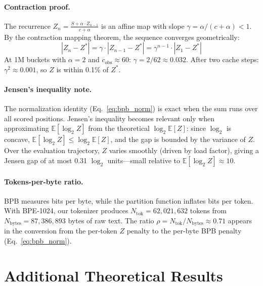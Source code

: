 \documentclass[11pt]{article}
\newcommand{\E}{\mathbb{E}}
\begin{document}
\paragraph{Contraction proof.} The recurrence $Z_n = \frac{S + \alpha \cdot Z_{n-1}}{c + \alpha}$ is an affine map with slope $\gamma = \alpha/(c + \alpha) < 1$. By the contraction mapping theorem, the sequence converges geometrically:
\[
|Z_n - Z^*| = \gamma \cdot |Z_{n-1} - Z^*| = \gamma^{n-1} \cdot |Z_1 - Z^*|
\]
At 1M buckets with $\alpha = 2$ and $c_{\text{obs}} \approx 60$: $\gamma = 2/62 \approx 0.032$. After two cache steps: $\gamma^2 \approx 0.001$, so $Z$ is within 0.1\% of $Z^*$.

\paragraph{Jensen's inequality note.} The normalization identity (Eq.~\ref{eq:bpb_norm}) is exact when the sum runs over all scored positions. Jensen's inequality becomes relevant only when approximating $\E[\log_2 Z]$ from the theoretical $\log_2 \E[Z]$: since $\log_2$ is concave, $\E[\log_2 Z] \leq \log_2 \E[Z]$, and the gap is bounded by the variance of $Z$. Over the evaluation trajectory, $Z$ varies smoothly (driven by load factor), giving a Jensen gap of at most 0.31 $\log_2$ units---small relative to $\E[\log_2 Z] \approx 10$.

\paragraph{Tokens-per-byte ratio.} BPB measures bits per byte, while the partition function inflates bits per token. With BPE-1024, our tokenizer produces $N_{\text{tok}} = 62{,}021{,}632$ tokens from $N_{\text{bytes}} = 87{,}386{,}893$ bytes of raw text. The ratio $\rho = N_{\text{tok}} / N_{\text{bytes}} \approx 0.71$ appears in the conversion from the per-token $Z$ penalty to the per-byte BPB penalty (Eq.~\ref{eq:bpb_norm}).

\section{Additional Theoretical Results}
\label{app:theorems}
\end{document}
